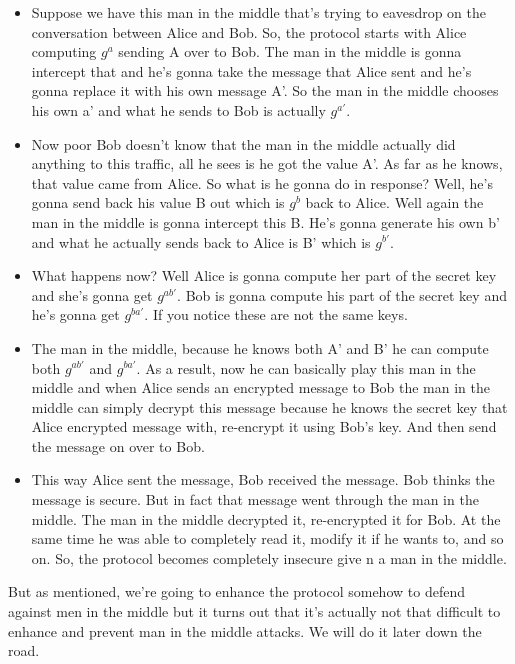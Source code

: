 \documentclass[11pt]{article}
\begin{document}
\begin{itemize}
\item
  Suppose we have this man in the middle that's trying to eavesdrop on
  the conversation between Alice and Bob. So, the protocol starts with
  Alice computing \(g^{a}\) sending A over to Bob. The man in the middle
  is gonna intercept that and he's gonna take the message that Alice
  sent and he's gonna replace it with his own message A'. So the man in
  the middle chooses his own a' and what he sends to Bob is actually
  \(g^{a'}\). 
\item
  Now poor Bob doesn't know that the man in the middle actually did
  anything to this traffic, all he sees is he got the value A'. As far
  as he knows, that value came from Alice. So what is he gonna do in
  response? Well, he's gonna send back his value B out which is
  \(g^{b}\) back to Alice. Well again the man in the middle is gonna
  intercept this B. He's gonna generate his own b' and what he actually
  sends back to Alice is B' which is \(g^{b'}\). 
\item
  What happens now? Well Alice is gonna compute her part of the secret
  key and she's gonna get \(g^{ab'}\). Bob is gonna compute his part of
  the secret key and he's gonna get \(g^{ba'}\). If you notice these are
  not the same keys. 
\item
  The man in the middle, because he knows both A' and B' he can compute
  both \(g^{ab'}\) and \(g^{ba'}\). As a result, now he can basically
  play this man in the middle and when Alice sends an encrypted message
  to Bob the man in the middle can simply decrypt this message because
  he knows the secret key that Alice encrypted message with, re-encrypt
  it using Bob's key. And then send the message on over to Bob. 
\item
  This way Alice sent the message, Bob received the message. Bob thinks
  the message is secure. But in fact that message went through the man
  in the middle. The man in the middle decrypted it, re-encrypted it for
  Bob. At the same time he was able to completely read it, modify it if
  he wants to, and so on. So, the protocol becomes completely insecure
  give n a man in the middle.
\end{itemize}

But as mentioned, we're going to enhance the protocol somehow to defend
against men in the middle but it turns out that it's actually not that
difficult to enhance and prevent man in the middle attacks. We will do
it later down the road.
\end{document}
